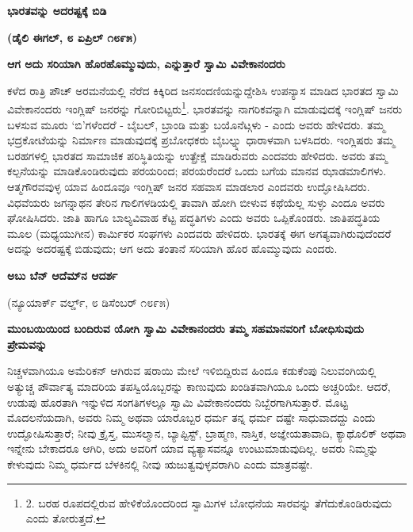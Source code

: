 \begin{center}
\textbf{ಭಾರತವನ್ನು ಅದರಷ್ಟಕ್ಕೆ ಬಿಡಿ}
\end{center}

\begin{center}
\textbf{(ಡೈಲಿ ಈಗಲ್, ೮ ಏಪ್ರಿಲ್ ೧೮೯೫)}
\end{center}

\textbf{ಆಗ ಅದು ಸರಿಯಾಗಿ ಹೊರಹೊಮ್ಮುವುದು, ಎನ್ನುತ್ತಾರೆ ಸ್ವಾಮಿ ವಿವೇಕಾನಂದರು}

ಕಳೆದ ರಾತ್ರಿ ಪೌಚ್ ಅರಮನೆಯಲ್ಲಿ ನೆರೆದ ಕಿಕ್ಕಿರಿದ ಜನಸಂದಣಿಯನ್ನುದ್ದೇಶಿಸಿ ಉಪನ್ಯಾಸ ಮಾಡಿದ ಭಾರತದ ಸ್ವಾಮಿ ವಿವೇಕಾನಂದರು ಇಂಗ್ಲಿಷ್ ಜನರನ್ನು ಗೋರಿಬಿಟ್ಟರು\footnote{2. ಬರಹ ರೂಪದಲ್ಲಿರುವ ಹೇಳಿಕೆಯೊಂದರಿಂದ ಸ್ವಾಮಿಗಳ ಬೋಧನೆಯ ಸಾರವನ್ನು ತೆಗೆದುಕೊಂಡಿರುವುದು ಎಂದು ತೋರುತ್ತದೆ.}. ಭಾರತವನ್ನು ನಾಗರಿಕವನ್ನಾಗಿ ಮಾಡುವುದಕ್ಕೆ ಇಂಗ್ಲಿಷ್ ಜನರು ಬಳಸುವ ಮೂರು ‘ಬಿ’ಗಳೆಂದರೆ - ಬೈಬಲ್, ಬ್ರಾಂಡಿ ಮತ್ತು ಬಯೊನೆಟ್ಗಳು - ಎಂದು ಅವರು ಹೇಳಿದರು. ತಮ್ಮ ಭದ್ರಕೋಟೆಯನ್ನು ನಿರ್ಮಾಣ ಮಾಡುವುದಕ್ಕೆ ಪ್ರಬೋಧಕರು ಬೈಬಲ್ನ್ನು ಧಾರಾಳವಾಗಿ ಬಳಸಿದರು. ಇಂಗ್ಲಿಷರು ತಮ್ಮ ಬರಹಗಳಲ್ಲಿ ಭಾರತದ ಸಾಮಾಜಿಕ ಪರಿಸ್ಥಿತಿಯನ್ನು ಉತ್ಪ್ರೇಕ್ಷೆ ಮಾಡಿರುವರು ಎಂದವರು ಹೇಳಿದರು. ಅವರು ತಮ್ಮ ಕಲ್ಪನೆಯನ್ನು ಮಾಡಿಕೊಂಡಿರುವುದು ಪರಯರಿಂದ; ಪರಯರೆಂದರೆ ಒಂದು ಬಗೆಯ ಮಾನವ ಝಾಡಮಾಲಿಗಳು. ಆತ್ಮಗೌರವವುಳ್ಳ ಯಾವ ಹಿಂದೂವೂ ಇಂಗ್ಲಿಷ್ ಜನರ ಸಹವಾಸ ಮಾಡಲಾರ ಎಂದವರು ಉದ್ಘೋಷಿಸಿದರು. ವಿಧವೆಯರು ಜಗನ್ನಾಥನ ತೇರಿನ ಗಾಲಿಗಳಡಿಯಲ್ಲಿ ತಾವಾಗಿ ಹೋಗಿ ಬೀಳುವ ಕಥೆಯೆಲ್ಲ ಸುಳ್ಳು ಎಂದೂ ಅವರು ಘೋಷಿಸಿದರು. ಜಾತಿ ಹಾಗೂ ಬಾಲ್ಯವಿವಾಹ ಕೆಟ್ಟ ಪದ್ಧತಿಗಳು ಎಂದು ಅವರು ಒಪ್ಪಿಕೊಂಡರು. ಜಾತಿಪದ್ಧತಿಯ ಮೂಲ (ಮಧ್ಯಯುಗೀನ) ಕಾರ್ಮಿಕರ ಸಂಘಗಳು ಎಂದವರು ಹೇಳಿದರು. ಭಾರತಕ್ಕೆ ಈಗ ಅಗತ್ಯವಾಗಿರುವುದೆಂದರೆ ಅದನ್ನು ಅದರಷ್ಟಕ್ಕೆ ಬಿಡುವುದು; ಆಗ ಅದು ತಂತಾನೆ ಸರಿಯಾಗಿ ಹೊರ ಹೊಮ್ಮುವುದು ಎಂದರು.

\textbf{ಅಬು ಬೆನ್ ಆದೆಮ್​ನ ಆದರ್ಶ}

\begin{center}
(ನ್ಯೂಯಾರ್ಕ್ ವರ್ಲ್ಡ್, ೮ ಡಿಸೆಂಬರ್ ೧೮೯೫)
\end{center}

\textbf{ಮುಂಬಯಿಯಿಂದ ಬಂದಿರುವ ಯೋಗಿ ಸ್ವಾಮಿ ವಿವೇಕಾನಂದರು ತಮ್ಮ ಸಹಮಾನವರಿಗೆ ಬೋಧಿಸುವುದು ಪ್ರೇಮವನ್ನು}

ನಿಚ್ಚಳವಾಗಿಯೂ ಅಮೆರಿಕನ್ ಆಗಿರುವ ಷರಾಯಿ ಮೇಲೆ ಇಳಿಬಿದ್ದಿರುವ ಹಿಂದೂ ಕಡುಕೆಂಪು ನಿಲುವಂಗಿಯಲ್ಲಿ ಅತ್ಯುಚ್ಚ ಪೌರ್ವಾತ್ಯ ಮಾದರಿಯ ತಪಸ್ವಿಯೊಬ್ಬರನ್ನು ಕಾಣುವುದು ಖಂಡಿತವಾಗಿಯೂ ಒಂದು ಅಚ್ಚರಿಯೇ. ಆದರೆ, ಉಡುಪು ಹೊರತಾಗಿ ಇನ್ನುಳಿದ ಸಂಗತಿಗಳಲ್ಲೂ ಸ್ವಾಮಿ ವಿವೇಕಾನಂದರು ನಿಬ್ಬೆರಗಾಗಿಸುತ್ತಾರೆ. ಮೊಟ್ಟ ಮೊದಲನೆಯದಾಗಿ, ಅವರು ನಿಮ್ಮ ಅಥವಾ ಯಾರೊಬ್ಬರ ಧರ್ಮ ತನ್ನ ಧರ್ಮ ದಷ್ಟೇ ಸಾಧುವಾದದ್ದು ಎಂದು ಉದ್ಘೋಷಿಸುತ್ತಾರೆ; ನೀವು ಕ್ರೈಸ್ತ, ಮುಸಲ್ಮಾನ, ಬ್ಯಾಪ್ಟಿಸ್ಟ್, ಬ್ರಾಹ್ಮಣ, ನಾಸ್ತಿಕ, ಅಜ್ಞೇಯತಾವಾದಿ, ಕ್ಯಾಥೊಲಿಕ್ ಅಥವಾ ಇನ್ನೇನು ಬೇಕಾದರೂ ಆಗಿರಿ, ಅದು ಅವರಿಗೆ ಯಾವ ವ್ಯತ್ಯಾಸವನ್ನೂ ಉಂಟುಮಾಡುವುದಿಲ್ಲ. ಅವರು ನಿಮ್ಮನ್ನು ಕೇಳುವುದು ನಿಮ್ಮ ಧರ್ಮದ ಬೆಳಕಿನಲ್ಲಿ ನೀವು ಋಜುತ್ವವುಳ್ಳವರಾಗಿರಿ ಎಂದು ಮಾತ್ರವಷ್ಟೇ.

